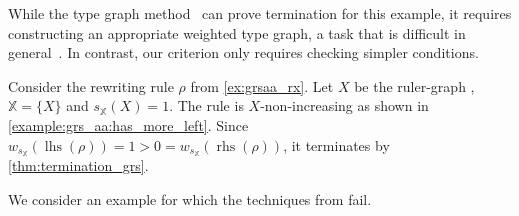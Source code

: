 While the type graph method~\cite{bruggink2014termination,bruggink2015proving,endrullis2024generalized} can prove termination for this example, it requires constructing an appropriate weighted type graph, a task that is difficult in general~\cite[]{bruggink2015proving}. 
In contrast, our criterion only requires checking simpler conditions.
\begin{example}
    \label{ex:termination:grsaa}
    Consider the rewriting rule $\rho$ from \autoref{ex:grsaa_rx}. Let $X$ be the ruler-graph , $\mathbb{X} = \{X\}$ and $s_\mathbb{X}(X) = 1$. The rule is $X$-non-increasing as shown in \autoref{example:grs_aa:has_more_left}. 
    Since \(w_{s_\mathbb{X}}(\operatorname{lhs}(\rho)) = 1 > 0 = w_{s_\mathbb{X}}(\operatorname{rhs}(\rho))\),
    it terminates by \autoref{thm:termination_grs}.
\end{example}
We consider an example for which the techniques from \cite{bruggink2014termination,bruggink2015proving,endrullis2024generalized,plump2018modular,overbeek2024termination_lmcs} fail.
    
